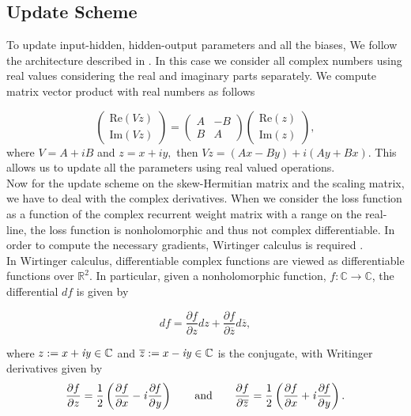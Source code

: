 \documentclass[letterpaper]{article} %
\begin{document}
\subsection{Update Scheme}

To update input-hidden, hidden-output parameters and all the biases, We follow the architecture described in \cite{Arjo16}. In this case we consider all complex numbers using real values considering the real and imaginary parts separately. We compute matrix vector product with real numbers as follows

\[ \begin{pmatrix}
\text{Re}(Vz)  \\
\text{Im}(Vz)  \end{pmatrix} =
\begin{pmatrix}
A & -B \\
B & A \end{pmatrix}
\begin{pmatrix}
\text{Re}(z)  \\
\text{Im}(z)  \end{pmatrix},
\]
\noindent where $V = A +iB$ and $z = x +iy,$ then $Vz = (Ax-By)+i(Ay+Bx).$ This allows us to update all the parameters using real valued operations.\\

\noindent Now for the update scheme on the skew-Hermitian matrix and the scaling matrix, we have to deal with the complex derivatives. When we consider the loss function as a function of the complex recurrent weight matrix with a range on the real-line, the loss function is nonholomorphic and thus not complex differentiable.   In order to compute the necessary gradients, Wirtinger calculus is required \cite{Kreutzdelgado09}.\\

\noindent In Wirtinger calculus, differentiable complex functions are viewed as differentiable functions over $\mathbb{R}^2$.  In particular, given a nonholomorphic function, $f: \mathbb{C} \to \mathbb{C}$, the differential $df$ is given by

\[
	df = \frac{\partial f}{\partial z}dz + \frac{\partial f}{\partial \overline{z}}d\overline{z},
\]

\noindent where $z := x + \it{i}y \in \mathbb{C}$ and $\overline{z} := x - \it{i}y \in \mathbb{C}$ is the conjugate, with Writinger derivatives given by  
\[
	\frac{\partial f}{\partial z} = \frac{1}{2}\left(\frac{\partial f}{\partial x} - \it{i}\frac{\partial f}{\partial y} \right) \qquad \text{and} \qquad \frac{\partial f}{\partial \overline{z}} = \frac{1}{2}\left(\frac{\partial f}{\partial x} + \it{i}\frac{\partial f}{\partial y}\right).
\]
\end{document}
